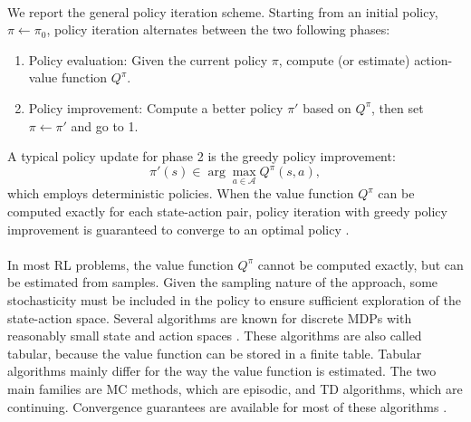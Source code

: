 \paragraph{}
We report the general policy iteration scheme. Starting from an initial policy, $\pi \gets \pi_0$, policy iteration alternates between the two following phases:
\begin{enumerate}
\item Policy evaluation: Given the current policy $\pi$, compute (or estimate) action-value function $Q^\pi$.
\item Policy improvement: Compute a better policy $\pi'$ based on $Q^\pi$, then set $\pi \gets \pi'$ and go to 1.
\end{enumerate}
A typical policy update for phase 2 is the greedy policy improvement:
\[
	\pi'(s) \in \arg\max\limits_{a \in \mathcal{A}}Q^\pi(s,a),
\]
which employs deterministic policies. When the value function $Q^\pi$ can be computed exactly for each state-action pair, policy iteration with greedy policy improvement is guaranteed to converge to an optimal policy \cite{Puterman:1979:CPI:2778782.2778787}.

\paragraph{} %
In most \ac{RL} problems, the value function $Q^\pi$ cannot be computed exactly, but can be estimated from samples. Given the sampling nature of the approach, some stochasticity must be included in the policy to ensure sufficient exploration of the state-action space. Several algorithms are known for discrete \ac{MDP}s with reasonably small state and action spaces \cite{Sutton:1998:IRL:551283}. These algorithms are also called tabular, because the value function can be stored in a finite table.
Tabular algorithms mainly differ for the way the value function is estimated. The two main families are \ac{MC} methods, which are episodic, and \ac{TD} algorithms, which are continuing. 
Convergence guarantees are available for most of these algorithms \cite{Tsitsiklis02} \cite{sutton1988learning} \cite{Dayan1992} \cite{watkins1992q} \cite{jaakkola1994convergence}.

